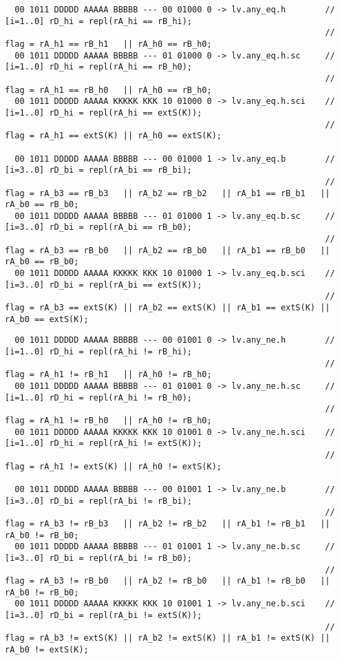 \begin{landscape}
{\footnotesize
\begin{verbatim}
  00 1011 DDDDD AAAAA BBBBB --- 00 01000 0 -> lv.any_eq.h        // [i=1..0] rD_hi = repl(rA_hi == rB_hi);   
                                                                 // flag = rA_h1 == rB_h1   || rA_h0 == rB_h0;
  00 1011 DDDDD AAAAA BBBBB --- 01 01000 0 -> lv.any_eq.h.sc     // [i=1..0] rD_hi = repl(rA_hi == rB_h0);   
                                                                 // flag = rA_h1 == rB_h0   || rA_h0 == rB_h0;
  00 1011 DDDDD AAAAA KKKKK KKK 10 01000 0 -> lv.any_eq.h.sci    // [i=1..0] rD_hi = repl(rA_hi == extS(K)); 
                                                                 // flag = rA_h1 == extS(K) || rA_h0 == extS(K);

  00 1011 DDDDD AAAAA BBBBB --- 00 01000 1 -> lv.any_eq.b        // [i=3..0] rD_bi = repl(rA_bi == rB_bi);   
                                                                 // flag = rA_b3 == rB_b3   || rA_b2 == rB_b2   || rA_b1 == rB_b1   || rA_b0 == rB_b0;
  00 1011 DDDDD AAAAA BBBBB --- 01 01000 1 -> lv.any_eq.b.sc     // [i=3..0] rD_bi = repl(rA_bi == rB_b0);   
                                                                 // flag = rA_b3 == rB_b0   || rA_b2 == rB_b0   || rA_b1 == rB_b0   || rA_b0 == rB_b0;
  00 1011 DDDDD AAAAA KKKKK KKK 10 01000 1 -> lv.any_eq.b.sci    // [i=3..0] rD_bi = repl(rA_bi == extS(K)); 
                                                                 // flag = rA_b3 == extS(K) || rA_b2 == extS(K) || rA_b1 == extS(K) || rA_b0 == extS(K);
\end{verbatim}

\clearpage
\begin{verbatim}
  00 1011 DDDDD AAAAA BBBBB --- 00 01001 0 -> lv.any_ne.h        // [i=1..0] rD_hi = repl(rA_hi != rB_hi);   
                                                                 // flag = rA_h1 != rB_h1   || rA_h0 != rB_h0;
  00 1011 DDDDD AAAAA BBBBB --- 01 01001 0 -> lv.any_ne.h.sc     // [i=1..0] rD_hi = repl(rA_hi != rB_h0);   
                                                                 // flag = rA_h1 != rB_h0   || rA_h0 != rB_h0;
  00 1011 DDDDD AAAAA KKKKK KKK 10 01001 0 -> lv.any_ne.h.sci    // [i=1..0] rD_hi = repl(rA_hi != extS(K)); 
                                                                 // flag = rA_h1 != extS(K) || rA_h0 != extS(K);

  00 1011 DDDDD AAAAA BBBBB --- 00 01001 1 -> lv.any_ne.b        // [i=3..0] rD_bi = repl(rA_bi != rB_bi);   
                                                                 // flag = rA_b3 != rB_b3   || rA_b2 != rB_b2   || rA_b1 != rB_b1   || rA_b0 != rB_b0;
  00 1011 DDDDD AAAAA BBBBB --- 01 01001 1 -> lv.any_ne.b.sc     // [i=3..0] rD_bi = repl(rA_bi != rB_b0);   
                                                                 // flag = rA_b3 != rB_b0   || rA_b2 != rB_b0   || rA_b1 != rB_b0   || rA_b0 != rB_b0;
  00 1011 DDDDD AAAAA KKKKK KKK 10 01001 1 -> lv.any_ne.b.sci    // [i=3..0] rD_bi = repl(rA_bi != extS(K)); 
                                                                 // flag = rA_b3 != extS(K) || rA_b2 != extS(K) || rA_b1 != extS(K) || rA_b0 != extS(K);



\end{verbatim}}
\end{landscape}

